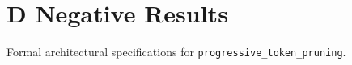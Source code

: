 \section{D Negative Results}

Formal architectural specifications for \texttt{progressive_token_pruning}.
